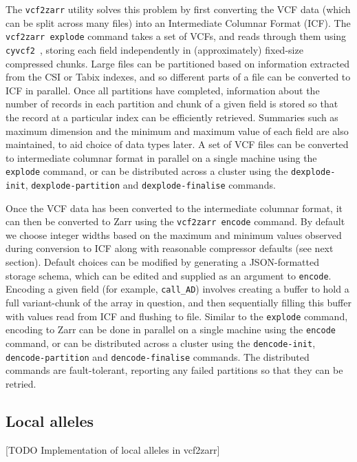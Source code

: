 \documentclass[a4paper,num-refs]{oup-contemporary}
\begin{document}
The \texttt{vcf2zarr} utility solves this problem by first converting 
the VCF data (which can be split across many files) into an Intermediate
Columnar Format (ICF). The \texttt{vcf2zarr explode} command takes a set
of VCFs, and reads through them using
\texttt{cyvcf2}~\cite{pedersen2017cyvcf2},
storing each field independently in (approximately) fixed-size 
compressed chunks.
Large files can be partitioned based on information extracted from the 
CSI or Tabix indexes, and so different parts of a file can be 
converted to ICF in parallel.
Once all partitions have completed, information about 
the number of records in each partition and chunk of a given
field is stored so that the record at a particular index 
can be efficiently retrieved. 
Summaries such as maximum dimension and the minimum and maximum value 
of each field are also maintained, to aid choice of data types later.
A set of VCF files can be converted to intermediate columnar 
format in parallel on a single machine 
using the \texttt{explode} command,
or can be distributed across a cluster using the 
\texttt{dexplode-init},
\texttt{dexplode-partition} and \texttt{dexplode-finalise} commands.

Once the VCF data has been converted to the intermediate columnar format,
it can then be converted to Zarr using the \texttt{vcf2zarr encode}
command. By default we choose integer widths based on the maximum
and minimum values observed during conversion to ICF
along with reasonable compressor defaults (see next section).
Default choices can be 
modified by generating a JSON-formatted storage schema,
which can be edited and supplied as an argument to \texttt{encode}.
Encoding a given field (for example, \texttt{call\_AD})
involves creating a buffer to hold a full variant-chunk of the 
array in question, and then sequentially filling this buffer with 
values read from ICF and flushing to file.
 Similar to the \texttt{explode} command,
encoding to Zarr can be done in parallel on a single 
machine using the \texttt{encode} command,
or can be distributed across a cluster using the 
\texttt{dencode-init},
\texttt{dencode-partition} and \texttt{dencode-finalise} commands.
The distributed commands are fault-tolerant, reporting any failed
partitions so that they can be retried.

\subsection{Local alleles}
[TODO Implementation of local alleles in vcf2zarr]
\end{document}
